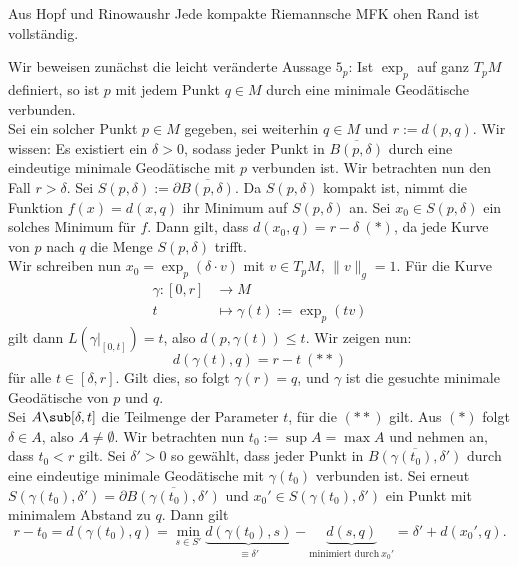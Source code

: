 \begin{korollar}{Aus Hopf und Rinow}{aushr}
Jede kompakte Riemannsche MFK ohen Rand ist vollständig.
\end{korollar}
\begin{beweis}
Wir beweisen zunächst die leicht veränderte Aussage $5_p$: Ist $\exp_p$ auf ganz $T_pM$ definiert, so ist $p$ mit jedem Punkt $q \in M$ durch eine minimale Geodätische verbunden.\\
Sei ein solcher Punkt $p \in M$ gegeben, sei weiterhin $q \in  M$ und $r := d(p,q)$. Wir wissen: Es existiert ein $\delta > 0$, sodass jeder Punkt in $\overline{B(p,\delta)}$ durch eine eindeutige minimale Geodätische mit $p$ verbunden ist. Wir betrachten nun den Fall $r > \delta$. Sei $S(p, \delta) := \partial \overline{B(p,\delta)}$. Da $S(p, \delta)$ kompakt ist, nimmt die Funktion $f(x)=d(x,q)$ ihr Minimum auf $S(p,\delta)$ an. Sei $x_0 \in S(p, \delta)$ ein solches Minimum für $f$. Dann gilt, dass $d(x_0,q)=r-\delta \ (\ast)$, da jede Kurve von $p$ nach $q$ die Menge $S(p,\delta)$ trifft.\\
Wir schreiben nun $x_0 = \exp_p(\delta \cdot v)$ mit $v \in T_pM$, $\| v \|_g = 1$. Für die Kurve
\begin{align}
\gamma: [0,r] &\to M\\
t &\mapsto \gamma(t):=\exp_p(tv)
\end{align}
gilt dann $L(\gamma|_{[0,t]}) = t$, also $d(p, \gamma(t)) \leq t$. Wir zeigen nun: 
\begin{equation}
d(\gamma(t), q) = r - t \ (\ast \ast)
\end{equation}
für alle $t \in [\delta, r]$. Gilt dies, so folgt $\gamma(r)=q$, und $\gamma$ ist die gesuchte minimale Geodätische von $p$ und $q$.\\
Sei $A \sub [\delta, t]$ die Teilmenge der Parameter $t$, für die $(\ast \ast)$ gilt. Aus $(\ast)$ folgt $\delta \in A$, also $A \neq \emptyset$. Wir betrachten nun $t_0 := \sup A = \max A$ und nehmen an, dass $t_0 < r$ gilt. Sei $\delta' > 0$ so gewählt, dass jeder Punkt in $\overline{B(\gamma(t_0), \delta')}$ durch eine eindeutige minimale Geodätische mit $\gamma(t_0)$ verbunden ist. Sei erneut $S(\gamma(t_0), \delta')= \partial \overline{B(\gamma(t_0), \delta')}$ und $x_0' \in S(\gamma(t_0), \delta')$ ein Punkt mit minimalem Abstand zu $q$. Dann gilt
\begin{equation}
r - t_0 = d(\gamma(t_0),q) = \min_{s \in S'} \underbrace{d(\gamma(t_0), s)}_{\equiv \delta'} - \underbrace{d(s,q)}_{\text{minimiert durch} \ x_0'} = \delta' + d(x_0', q).

\end{equation}
\end{beweis}
